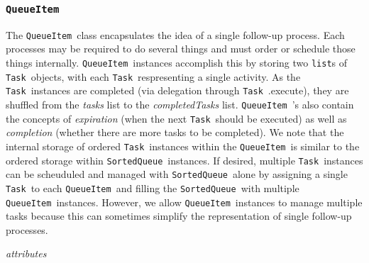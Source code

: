 \documentclass{article}
\newcommand{\SortedQueue}{\texttt{SortedQueue}~}
\newcommand{\QueueItem}{\texttt{QueueItem}~}
\newcommand{\Task}{\texttt{Task}~}
\begin{document}

\subsubsection{\QueueItem}
\label{sec: QueueItem}

The \QueueItem class encapsulates the idea of a single follow-up process.
Each processes may be required to do several things and must order or schedule those things internally.
\QueueItem instances accomplish this by storing two \texttt{list}s of \Task objects, with each \Task respresenting a single activity.
As the \Task instances are completed (via delegation through \Task.execute), they are shuffled from the \textit{tasks} list to the \textit{completedTasks} list.
\QueueItem's also contain the concepts of \textit{expiration} (when the next \Task should be executed) as well as \textit{completion} (whether there are more tasks to be completed).
We note that the internal storage of ordered \Task instances within the \QueueItem is similar to the ordered storage within \SortedQueue instances.
If desired, multiple \Task instances can be scheuduled and managed with \SortedQueue alone by assigning a single \Task to each \QueueItem and filling the \SortedQueue with multiple \QueueItem instances.
However, we allow \QueueItem instances to manage multiple tasks because this can sometimes simplify the representation of single follow-up processes.

\vspace{0.5cm}
\noindent
\textit{attributes}
\end{document}
